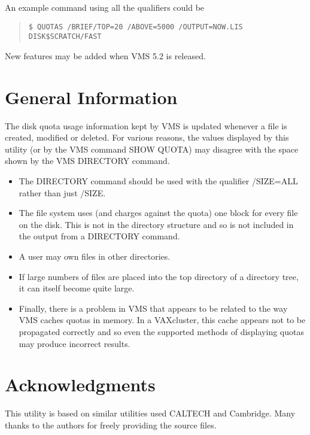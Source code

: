 An example command using all the qualifiers could be
\begin{quote}
\begin{verbatim}
$ QUOTAS /BRIEF/TOP=20 /ABOVE=5000 /OUTPUT=NOW.LIS DISK$SCRATCH/FAST  
\end{verbatim}
\end{quote}

New features may be added when VMS 5.2 is released.

\section{General Information}

The disk quota usage information kept by VMS is updated whenever a file is
created, modified or deleted. For various reasons, the values displayed
by this utility (or by the VMS command SHOW QUOTA) may disagree with the
space shown by the VMS DIRECTORY command.

\begin{itemize}

\item The DIRECTORY command should be used with the qualifier /SIZE=ALL
rather than just /SIZE.

\item The file system uses (and charges against the quota) one block for
every file on the disk.
This is not in the directory structure and so is not included in the output
from a DIRECTORY command.

\item A user may own files in other directories.

\item If large numbers of files are placed into the top directory of a
directory tree, it can itself become quite large.

\item Finally, there is a problem in VMS that appears to be related to
the way VMS caches quotas in memory.
In a VAXcluster, this cache appears not to be propagated correctly and so
even the supported methods of displaying quotas may produce incorrect results.
\end{itemize}

\section{Acknowledgments}

This utility is based on similar utilities used CALTECH and Cambridge.
Many thanks to the authors for freely providing the source files.



